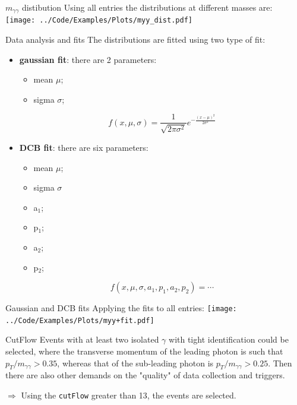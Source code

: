 \documentclass[10pt,UKenglish, leqno, xcolor = dvipsnames]{beamer}
\begin{document}
		\begin{frame}{$m_{\gamma\gamma}$ distibution}
			\vfill
			Using all entries the distributions at different masses are:
			\texttt{[image: ../Code/Examples/Plots/myy\_dist.pdf]}
			\vfill
		\end{frame}

		\begin{frame}{Data analysis and fits}
			\vfill
			The distributions are fitted using two type of fit:
			\begin{itemize}
				\item \textbf{gaussian fit}: there are 2 parameters:
				\begin{itemize}
					\item mean $\mu$;
					\item sigma $\sigma$;
				\end{itemize}
				$$
				f(x,\mu,\sigma)= \frac{1}{\sqrt{2\pi\sigma^2}}e^{-\frac{(x-\mu)^2}{2\sigma^2}}
				$$
				\item \textbf{DCB fit}: there are six parameters:
				\begin{itemize}
					\item mean $\mu$;
					\item sigma $\sigma$
					\item a$_1$;
					\item p$_1$;
					\item a$_2$;
					\item p$_2$;
				\end{itemize}
				$$
				f(x,\mu,\sigma,a_1,p_1,a_2,p_2) = \cdots
				$$
			\end{itemize}
			\vfill
		\end{frame}
	
		\begin{frame}{Gaussian and DCB fits}
			\vfill
			Applying the fits to all entries:
			\texttt{[image: ../Code/Examples/Plots/myy+fit.pdf]}
			\vfill
		\end{frame}
	
		\begin{frame}{CutFlow}
			\vfill
			Events with at least two isolated $\gamma$ with tight identification could be selected, where the transverse momentum of the leading photon is such that $p_T/m_{\gamma\gamma} > 0.35$, whereas that of the sub-leading photon is $p_T/m_{\gamma\gamma} > 0.25$. Then there are also other demands on the "quality" of data collection and triggers.
			
			\vspace{0.5cm}
			$\Longrightarrow$ Using the \texttt{cutFlow} greater than 13, the events are selected.
			\vfill
		\end{frame}
	
\end{document}

